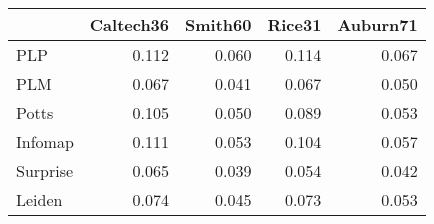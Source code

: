 \begin{tabular}{lrrrr}
\toprule
{} & Caltech36 & Smith60 & Rice31 & Auburn71 \\
\midrule
PLP      &     0.112 &   0.060 &  0.114 &    0.067 \\
PLM      &     0.067 &   0.041 &  0.067 &    0.050 \\
Potts    &     0.105 &   0.050 &  0.089 &    0.053 \\
Infomap  &     0.111 &   0.053 &  0.104 &    0.057 \\
Surprise &     0.065 &   0.039 &  0.054 &    0.042 \\
Leiden   &     0.074 &   0.045 &  0.073 &    0.053 \\
\bottomrule
\end{tabular}
